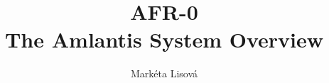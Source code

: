 \documentclass[12pt,a4paper,twoside,titlepage]{book}
\begin{document}
\frontmatter
\title{AFR-0\\ \large The Amlantis System Overview}
\renewcommand{\docversion}{0.11}
\author{Markéta Lisová}
\maketitle
\clearemptydoublepage
\dominitoc

\tableofcontents

\mainmatter
\sloppy







%
\end{document}
